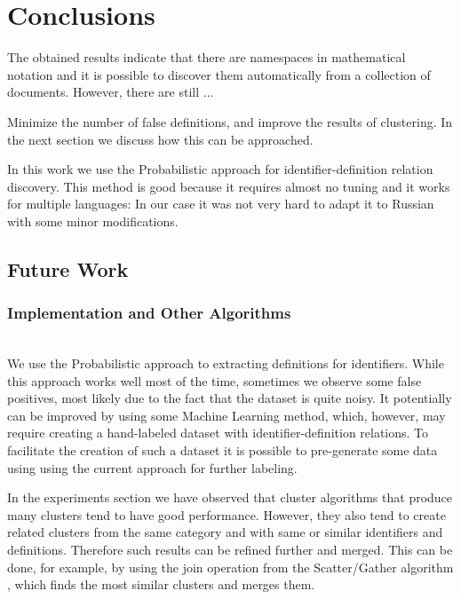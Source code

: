 \section{Conclusions}




The obtained results indicate that there are namespaces in mathematical notation
and it is possible to discover them automatically from a collection of documents. 
However, there are still ...

Minimize the number of false definitions, and improve the results of clustering. 
In the next section we discuss how this can be approached.


In this work we use the Probabilistic approach for identifier-definition relation
discovery. This method is good because it requires almost no tuning and it works for
multiple languages: In our case it was not very hard to adapt it to Russian
with some minor modifications.


\subsection{Future Work}

\subsubsection{Implementation and Other Algorithms}  \ \\

We use the Probabilistic approach to extracting definitions for identifiers. 
While this approach works well most of the time, sometimes we observe 
some false positives, most likely due to the fact that the dataset is 
quite noisy. It potentially can be improved by using some Machine Learning
method, which, however, may require creating a hand-labeled dataset 
with identifier-definition relations. To facilitate the creation of such a 
dataset it is possible to pre-generate some data using using the current approach
for further labeling. 

In the experiments section we have observed that cluster algorithms that produce 
many clusters tend to have good performance. However, they also tend to create related 
clusters from the same category and with same or similar identifiers and 
definitions. Therefore such results can be refined further and merged. 
This can be done, for example, by using the join operation from 
the Scatter/Gather algorithm \cite{cutting1992scatter}, which finds the most 
similar clusters and merges them.

